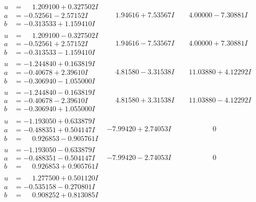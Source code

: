 \documentclass[1p]{elsarticle_modified}
\theoremstyle{definition}
\begin{document}
$$\begin{array}{c|c|c}
\begin{aligned}
u &= \phantom{-}1.209100 + 0.327502 I \\
a &= -0.52561 - 2.57152 I \\
b &= -0.313533 + 1.159410 I\end{aligned}
 & \phantom{-}1.94616 + 7.53567 I & \phantom{-}4.00000 - 7.30881 I \\ \hline\begin{aligned}
u &= \phantom{-}1.209100 - 0.327502 I \\
a &= -0.52561 + 2.57152 I \\
b &= -0.313533 - 1.159410 I\end{aligned}
 & \phantom{-}1.94616 - 7.53567 I & \phantom{-}4.00000 + 7.30881 I \\ \hline\begin{aligned}
u &= -1.244840 + 0.163819 I \\
a &= -0.40678 + 2.39610 I \\
b &= -0.306940 - 1.055000 I\end{aligned}
 & \phantom{-}4.81580 - 3.31538 I & \phantom{-}11.03880 + 4.12292 I \\ \hline\begin{aligned}
u &= -1.244840 - 0.163819 I \\
a &= -0.40678 - 2.39610 I \\
b &= -0.306940 + 1.055000 I\end{aligned}
 & \phantom{-}4.81580 + 3.31538 I & \phantom{-}11.03880 - 4.12292 I \\ \hline\begin{aligned}
u &= -1.193050 + 0.633879 I \\
a &= -0.488351 + 0.504147 I \\
b &= \phantom{-}0.926853 - 0.905761 I\end{aligned}
 & -7.99420 + 2.74053 I & \phantom{-0.000000 } 0 \\ \hline\begin{aligned}
u &= -1.193050 - 0.633879 I \\
a &= -0.488351 - 0.504147 I \\
b &= \phantom{-}0.926853 + 0.905761 I\end{aligned}
 & -7.99420 - 2.74053 I & \phantom{-0.000000 } 0 \\ \hline\begin{aligned}
u &= \phantom{-}1.277500 + 0.501120 I \\
a &= -0.535158 - 0.270801 I \\
b &= \phantom{-}0.908252 + 0.813085 I\end{aligned}

\end{array}$$
\end{document}
